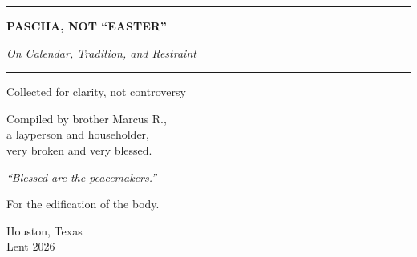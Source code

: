 \documentclass[10pt,twoside,openany]{book}
\begin{document}
\begin{titlepage}
\thispagestyle{empty}
\pagecolor{white}


\begin{center}

{\color{gold}\rule{2.5in}{0.6pt}}

\vspace{18pt}

{\LARGE\bfseries\color{deepblue} PASCHA, NOT ``EASTER''}

\vspace{12pt}

{\large\color{burgundy}\itshape On Calendar, Tradition, and Restraint}

\vspace{6pt}

{\color{gold}\rule{2.5in}{0.6pt}}

\vspace{24pt}

{\normalsize Collected for clarity, not controversy}

\vspace{18pt}

{\small Compiled by brother Marcus R.,\\
a layperson and householder,\\
very broken and very blessed.}

\vspace{20pt}

{\itshape\color{deepblue} ``Blessed are the peacemakers.''}

\vspace{14pt}

{\small For the edification of the body.}

\vspace{24pt}

{\color{gold}\Large\scalebox{2}{$+$}}

\vspace{24pt}

{\small Houston, Texas\\
Lent 2026}

\end{center}

\end{titlepage}
\end{document}
